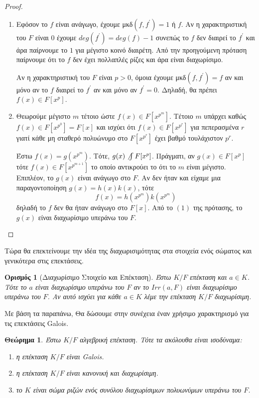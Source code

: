 \documentclass[oneside,a4paper]{article}
\newtheorem{theorem}{Θεώρημα}
\newtheorem*{defn}{Ορισμός}
\newcommand {\tl}{\textlatin}
\begin{document}
\begin{proof} $ $

	\begin{enumerate}
		\item Εφόσον το $f$ είναι ανάγωγο, έχουμε μκδ$(f,f^{\prime}) = 1$ ή $f$. Αν η χαρακτηριστική του $F$ είναι $0$ έχουμε $deg(f^{\prime}) = deg(f) -1$  συνεπώς το $f$ δεν διαιρεί το $f^{\prime}$ και άρα παίρνουμε το $1$ για μέγιστο κοινό διαιρέτη. Από την προηγούμενη πρόταση παίρνουμε ότι το $f$ δεν έχει πολλαπλές ρίζες και άρα είναι διαχωρίσιμο.
		
		Αν η χαρακτηριστική του $F$ είναι $p>0$, όμοια έχουμε μκδ$(f,f^{\prime}) = f$ αν και μόνο αν το $f$ διαιρεί το $f^{\prime}$ αν και μόνο αν $f^{\prime} = 0$. Δηλαδή, θα πρέπει $f(x) \in F[x^p]$.

		\item Θεωρούμε μέγιστο $m$ τέτοιο ώστε $f(x) \in F[x^{p^m}]$. Τέτοιο $m$ υπάρχει καθώς $f(x) \in F[x^{p^0}]=F[x]$ και ισχύει ότι $f(x) \in F[x^{p^r}]$ για πεπερασμένα $r$ γιατί κάθε μη σταθερό πολυώνυμο στο $F[x^{p^r}]$ έχει βαθμό τουλάχιστον $p^r$.
		
		Έστω $f(x) = g(x^{p^m})$. Τότε, $g(x) \not\int F[x^p]$. Πράγματι, αν $g(x) \in F[x^p]$ τότε $f(x) \in F[x^{p^{m+1}}]$ το οποίο αντικρούει το ότι το $m$ είναι μέγιστο. Επιπλέον, το $g(x)$ είναι ανάγωγο στο $F$. Αν δεν ήταν και είχαμε μια παραγοντοποίηση $g(x) = h(x) k(x)$, τότε
		$$f(x) = h(x^{p^m})k(x^{p^m})$$
		δηλαδή το $f$ δεν θα ήταν ανάγωγο στο $F[x]$. Από το $(1)$ της πρότασης, το $g(x)$ είναι διαχωρίσιμο υπεράνω του $F$.
	\end{enumerate}
\end{proof}

\vspace{0.1cm}
\noindent Τώρα θα επεκτείνουμε την ιδέα της διαχωρισιμότητας στα στοιχεία ενός σώματος και γενικότερα στις επεκτάσεις.

\begin{defn}[Διαχωρίσιμο Στοιχείο και Επέκταση]
	Έστω $K/F$ επέκταση και $a \in K$. Τότε το $a$ είναι διαχωρίσιμο υπεράνω του $F$ αν το $Irr(a,F)$ είναι διαχωρίσιμο υπεράνω του $F$. Αν αυτό ισχύει για κάθε $a \in K$ λέμε την επέκταση $K/F$ διαχωρίσιμη.
\end{defn}
\vspace{0.1cm}
\noindent Με βάση τα παραπάνω, Θα δώσουμε στην συνέχεια έναν χρήσιμο χαρακτηρισμό για τις επεκτάσεις \tl{Galois}.
\vspace{0.1cm}
\begin{theorem}
	Έστω $K/F$ αλγεβρική επέκταση. Τότε τα ακόλουθα είναι ισοδύναμα:
	\begin{enumerate}
		\item η επέκταση $K/F$ είναι \tl{Galois}.
		\item η επέκταση $K/F$ είναι κανονική και διαχωρίσιμη.
		\item το $K$ είναι σώμα ριζών ενός συνόλου διαχωρίσιμων πολυωνύμων υπεράνω του $F$.
	\end{enumerate}
\end{theorem}
\end{document}
